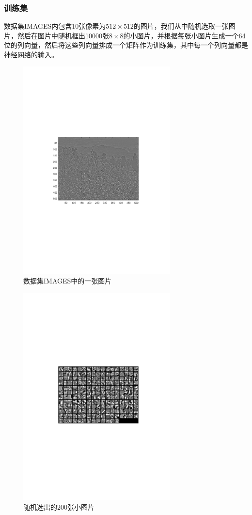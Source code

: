 \subsubsection*{训练集}
数据集IMAGES内包含10张像素为$512\times512$的图片，我们从中随机选取一张图片，然后在图片中随机框出10000张$8\times8$的小图片，并根据每张小图片生成一个64位的列向量，然后将这些列向量排成一个矩阵作为训练集，其中每一个列向量都是神经网络的输入。

\begin{figure}[H]
\centering
\includegraphics[width=8cm]{fig/INPUT_figure.pdf}
\caption{数据集IMAGES中的一张图片}
\end{figure}

\begin{figure}[H]
\centering
\includegraphics[width=8cm]{fig/sel.pdf}
\caption{随机选出的200张小图片}
\end{figure}



